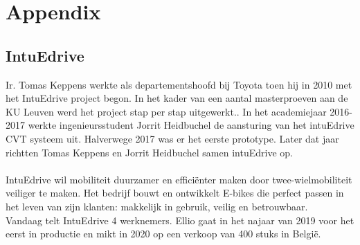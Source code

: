 \chapter*{Appendix}
\section*{IntuEdrive}
Ir. Tomas Keppens werkte als departementshoofd bij Toyota toen hij in 2010 met het IntuEdrive project begon. In het kader van een aantal masterproeven aan de KU Leuven werd het project stap per stap uitgewerkt.. In het academiejaar 2016-2017 werkte ingenieursstudent Jorrit Heidbuchel de aansturing van het intuEdrive CVT systeem uit. Halverwege 2017 was er het eerste prototype. Later dat jaar richtten Tomas Keppens en Jorrit Heidbuchel samen intuEdrive op.
\\\\
IntuEdrive wil mobiliteit duurzamer en efficiënter maken door twee-wielmobiliteit veiliger te maken. Het bedrijf bouwt en ontwikkelt E-bikes die perfect passen in het leven van zijn klanten: makkelijk in gebruik, veilig en betrouwbaar.
\\
Vandaag telt IntuEdrive 4 werknemers. Ellio gaat in het najaar van 2019 voor het eerst in productie en mikt in 2020 op een verkoop van 400 stuks in België.


